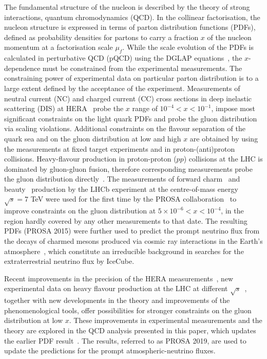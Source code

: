 \documentclass[12pt]{article}
\begin{document}
The fundamental structure of the nucleon is described by the theory of strong interactions, quantum chromodynamics (QCD).
In the collinear factorisation, the nucleon structure is expressed in terms of parton distribution functions (PDFs), defined 
as probability densities for partons to carry a fraction $x$ of the nucleon momentum at a factorisation scale $\mu_f$. While the 
scale evolution of the PDFs is calculated in perturbative QCD (pQCD) using the DGLAP equations~\cite{Dokshitzer:1977sg,Gribov:1972ri,Altarelli:1977zs,Curci:1980uw,Furmanski:1980cm,Moch:2004pa,Vogt:2004mw}, the 
$x$-dependence must be constrained from the experimental measurements. The constraining power of experimental data 
on particular parton distribution is to a large extent defined by the acceptance of the experiment. Measurements of 
neutral current (NC) and charged current (CC) cross sections in deep inelastic scattering (DIS) at HERA~\cite{Abramowicz:2015mha} probe the $x$ range of $10^{-4}<x<10^{-1}$, impose most significant constraints on the light quark PDFs and probe the gluon distribution via scaling violations. Additional constraints on the flavour separation of the quark sea and on the gluon distribution at low and high $x$ are obtained by using the measurements at fixed target experiments and in proton-(anti)proton collisions. 
Heavy-flavour production in proton-proton ($pp$) collisions at the LHC is dominated by gluon-gluon fusion, therefore corresponding measurements probe the gluon distribution directly~\cite{Zenaiev:2015rfa,Gauld:2015yia,Gauld:2016kpd,Bertone:2018dse}. 
The measurements of forward charm~\cite{Aaij:2013mga} and beauty~\cite{Aaij:2013noa} production by the LHCb experiment at the centre-of-mass energy $\sqrt{s}=7$ TeV were used for the first time by the PROSA collaboration~\cite{Zenaiev:2015rfa} to improve constraints on the gluon distribution at $5 \times 10^{-6}< x < 10^{-4}$, in the region hardly covered by any other measurements to that date. 
The resulting PDFs (PROSA 2015) were further used to predict the prompt neutrino flux from the decays of charmed mesons produced via cosmic ray interactions in the Earth's atmosphere~\cite{Garzelli:2016xmx}, which constitute an irreducible background in searches for the extraterrestrial neutrino flux by IceCube.

Recent improvements in the precision of the HERA measurements~\cite{Abramowicz:2015mha,H1:2018flt}, new experimental data on heavy flavour production at the LHC at 
different $\sqrt{s}$~\cite{Aaij:2015bpa,Aaij:2016jht,Acharya:2017jgo,Acharya:2019mgn}, together with new developments in the theory and improvements of the phenomenological tools, offer 
possibilities for stronger constraints on the gluon distribution at low $x$. These improvements in experimental measurements 
and the theory are explored in the QCD analysis presented in this paper, which updates the earlier PDF result~\cite{Zenaiev:2015rfa}. The results, referred to as PROSA 2019, are used to update the predictions for the prompt atmospheric-neutrino fluxes. 
\end{document}
